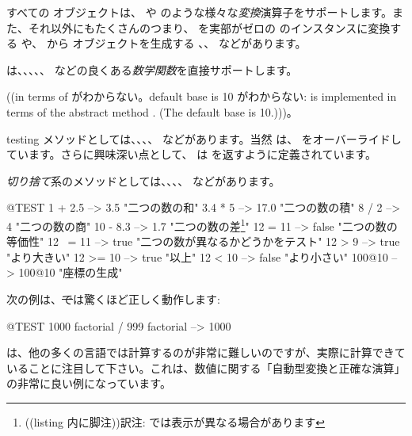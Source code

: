 \documentclass[a4paper,10pt,twoside]{book}
\begin{document}
すべての  オブジェクトは、 や  のような様々な\emph{変換}演算子をサポートします。また、それ以外にもたくさんのつまり、 を実部がゼロの  のインスタンスに変換する  や、 から  オブジェクトを生成する 、、 などがあります。

 は、、、、、 などの良くある\emph{数学関数}を直接サポートします。

((in terms of がわからない。default base is 10 がわからない:  is implemented in terms of the abstract method . (The default base is 10.)))。

testing メソッドとしては、、、、 などがあります。当然  は、 をオーバーライドしています。さらに興味深い点として、 は  を返すように定義されています。

\emph{切り捨て}系のメソッドとしては、、、、 などがあります。

\begin{code}{@TEST}
1 + 2.5     --> 3.5             "二つの数の和"
3.4 * 5      --> 17.0           "二つの数の積"
8 / 2         --> 4                 "二つの数の商"
10 - 8.3   --> 1.7              "二つの数の差\footnote{((listing 内に脚注))訳注:  では表示が異なる場合があります}"
12 = 11    --> false           "二つの数の等価性"
12 ~= 11 --> true            "二つの数が異なるかどうかをテスト"
12 > 9      --> true            "より大きい"
12 >= 10  --> true            "以上"
12 < 10    --> false           "より小さい"
100@10   --> 100@10    "座標の生成"
\end{code}

次の例は、\st では驚くほど正しく動作します:
\begin{code}{@TEST}
1000 factorial / 999 factorial --> 1000
\end{code}
 は、他の多くの言語では計算するのが非常に難しいのですが、実際に計算できていることに注目して下さい。これは、数値に関する「自動型変換と正確な演算」の非常に良い例になっています。
\end{document}
